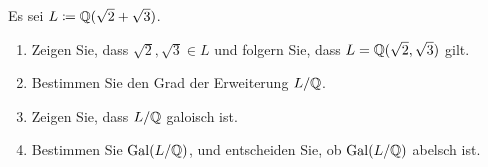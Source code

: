 \begin{question}[subtitle = Die Erweiterung $\Rational(\sqrt{2} + \sqrt{3})/\Rational$]
  Es sei $L \coloneqq \mathbb{Q}(\sqrt{2} + \sqrt{3})$.
  \begin{enumerate}
    \item
      Zeigen Sie, dass $\sqrt{2}, \sqrt{3} \in L$ und folgern Sie, dass $L = \mathbb{Q}(\sqrt{2}, \sqrt{3})$ gilt.
    \item
      Bestimmen Sie den Grad der Erweiterung $L/\mathbb{Q}$.
    \item
      Zeigen Sie, dass $L/\mathbb{Q}$ galoisch ist.
    \item
      Bestimmen Sie $\operatorname{Gal}(L/\mathbb{Q})$, und entscheiden Sie, ob $\operatorname{Gal}(L/\mathbb{Q})$ abelsch ist.
  \end{enumerate}
\end{question}



